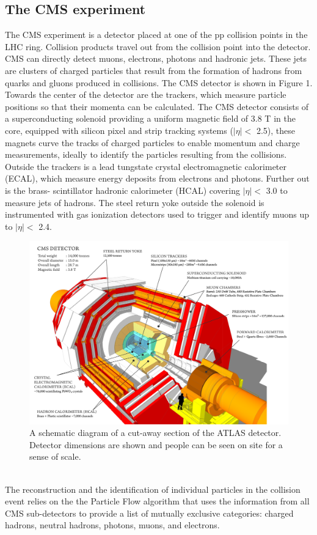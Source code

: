 \documentclass[letter]{article}
\newcommand\tab[1][1cm]{\hspace*{#1}}
\begin{document}
\subsection{The CMS experiment}
\tab The CMS experiment is a detector placed at one of the pp collision points in the LHC ring. Collision products travel out from the collision point into the detector. CMS can directly detect muons, electrons, photons and hadronic jets. These jets are clusters of charged particles that result from the formation of hadrons from quarks and gluons produced in collisions. The CMS detector is shown in Figure 1. Towards the center of the detector are the trackers, which measure particle positions so that their momenta can be calculated.
The CMS detector \cite{cmsinfo} consists of a superconducting solenoid providing a uniform magnetic field of 3.8 T in the core, equipped with silicon pixel and strip tracking systems ($|\eta| <$ 2.5), these magnets curve the tracks of charged particles to enable momentum and charge measurements, ideally to identify the particles resulting from the collisions. Outside the trackers is a lead tungstate crystal electromagnetic calorimeter (ECAL), which measure energy deposits from electrons and photons. Further out is the brass- scintillator hadronic calorimeter (HCAL) covering $|\eta| <$ 3.0 to measure jets of hadrons. The steel return yoke outside the solenoid is instrumented with gas ionization detectors used to trigger and identify muons up to $|\eta| <$ 2.4. 
\begin{figure}
    \centering
    \includegraphics[scale=0.1]{cms}
    \caption{A schematic diagram of a cut-away section of the ATLAS detector. Detector dimensions are shown and people can be seen on site for a sense of scale.}
    \label{fig:cms}
\end{figure} 
\vspace{3pt} \\
\tab The reconstruction and the identification of individual particles in the collision event relies on the the Particle Flow algorithm \cite{flow,flow2} that uses the information from all CMS sub-detectors to provide a list of mutually exclusive categories: charged hadrons, neutral hadrons, photons, muons, and electrons.
\end{document}
